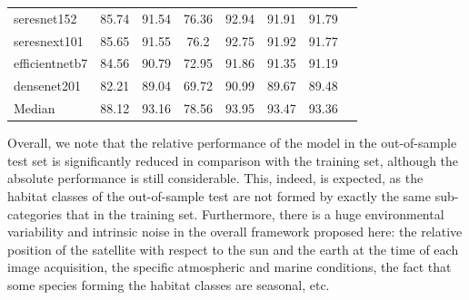 \begin{table}[H]
\begin{tabular}{lccccccc}
        \\
        seresnet152             & 85.74          & 91.54          & 76.36
                                & 92.94          & 91.91          & 91.79
        \\
        seresnext101            & 85.65          & 91.55          & 76.2
                                & 92.75          & 91.92          & 91.77
        \\
        efficientnetb7          & 84.56          & 90.79          & 72.95
                                & 91.86          & 91.35          & 91.19
        \\
        densenet201             & 82.21          & 89.04          & 69.72
                                & 90.99          & 89.67          & 89.48
        \\
        \hdashline
        Median                  & 88.12          & 93.16          & 78.56
                                & 93.95          & 93.47          & 93.36
        \\
        \bottomrule
    \end{tabular}
\end{table}

Overall, we note that the relative performance of the model in the
out-of-sample test set is significantly reduced in comparison with the training
set, although the absolute performance is still considerable. This, indeed, is
expected, as the habitat classes of the out-of-sample test are not formed by
exactly the same sub-categories that in the training set. Furthermore, there is
a huge environmental variability and intrinsic noise in the overall framework
proposed here: the relative position of the satellite with respect to the sun
and the earth at the time of each image acquisition, the specific atmospheric
and marine conditions, the fact that some species forming the habitat classes
are seasonal, etc.

